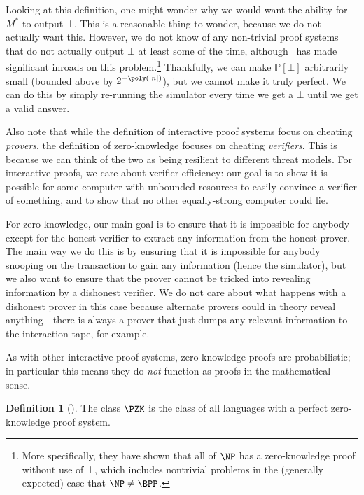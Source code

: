 \documentclass[english,12pt]{reedthesis}
\theoremstyle{plain}
\theoremstyle{definition}
\newtheorem{defn}[defn]{Definition}
\theoremstyle{remark}
\DeclarePairedDelimiter{\abs}{\lvert}{\rvert}
\begin{document}
Looking at this definition, one might wonder why we would want the ability for
$M^{*}$ to output $\bot$. This is a reasonable thing to wonder, because we do not
actually want this. However, we do not know of any non-trivial proof systems
that do not actually output $\bot$ at least some of the time, although~\cite{GT20}
has made significant inroads on this problem.\footnote{More specifically, they
  have shown that all of $\NP$ has a zero-knowledge proof without use of $\bot$,
  which includes nontrivial problems in the (generally expected) case that
  $\NP \ne \BPP$.} Thankfully, we can make $\mathbb{P}[\bot]$ arbitrarily small (bounded
above by $2^{-\poly(\abs{n})}$), but we cannot make it truly perfect. We can do
this by simply re-running the simulator every time we get a $\bot$ until we get a
valid answer.

Also note that while the definition of interactive proof systems focus on
cheating \emph{provers}, the definition of zero-knowledge focuses on cheating
\emph{verifiers}. This is because we can think of the two as being resilient to
different threat models. For interactive proofs, we care about verifier
efficiency: our goal is to show it is possible for some computer with unbounded
resources to easily convince a verifier of something, and to show that no other
equally-strong computer could lie.

For zero-knowledge, our main goal is to ensure that it is impossible for anybody
except for the honest verifier to extract any information from the honest
prover. The main way we do this is by ensuring that it is impossible for anybody
snooping on the transaction to gain any information (hence the simulator), but
we also want to ensure that the prover cannot be tricked into revealing
information by a dishonest verifier. We do not care about what happens with a
dishonest prover in this case because alternate provers could in theory reveal
anything---there is always a prover that just dumps any relevant information to
the interaction tape, for example.

As with other interactive proof systems, zero-knowledge proofs are
probabilistic; in particular this means they do \emph{not} function as proofs in
the mathematical sense.

\begin{defn}[{\cite[Def.\ 4.3.5]{Go01}}]\label{def:pzk}
  The class $\PZK$ is the class of all languages with a perfect zero-knowledge
  proof system.
\end{defn}
\end{document}
